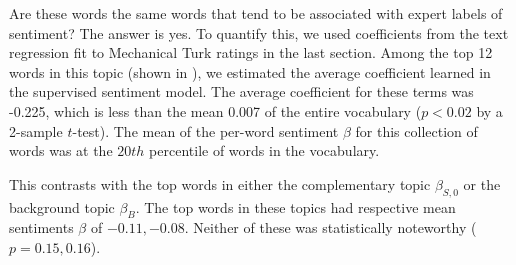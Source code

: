 Are these words the same words that tend to be associated with expert
labels of sentiment?  The answer is yes.  To quantify this, we used
coefficients from the text regression fit to Mechanical Turk ratings
in the last section.  Among the top 12 words in this topic (shown in
), we estimated the average coefficient
learned in the supervised sentiment model.  The average coefficient
for these terms was -0.225, which is less than the mean 0.007 of the
entire vocabulary ($p < 0.02$ by a 2-sample $t$-test).  The mean of
the per-word sentiment $\beta$ for this collection of words was at the
$20th$ percentile of words in the vocabulary.

This contrasts with the top words in either the complementary topic
$\beta_{S,0}$ or the background topic $\beta_{B}$.  The top words in
these topics had respective mean sentiments $\beta$ of $-0.11, -0.08$.
Neither of these was statistically noteworthy ($p=0.15,0.16$).



